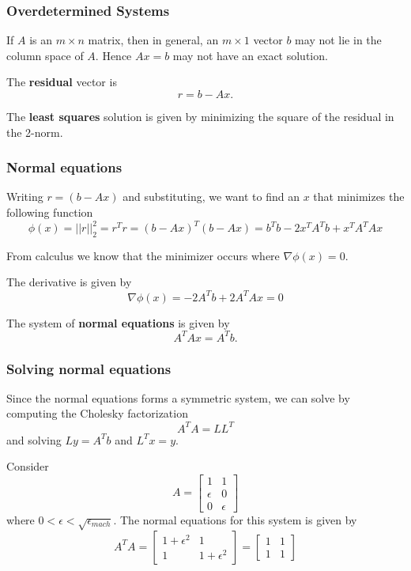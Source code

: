 \documentclass[10pt]{beamer}
\begin{document}
\begin{frame}
\frametitle{Overdetermined Systems}
If $A$ is an $m\times n$ matrix, then in general, an $m \times 1$ vector $b$ may not lie in the column space of $A$.  Hence $Ax=b$ may not have an exact solution.

\begin{definition} The {\bf{residual}} vector is  $$r = b-Ax.$$ 
\end{definition}
The {\bf{least squares}} solution is given by minimizing the square of the residual in the 2-norm.

\end{frame}
\begin{frame}
\frametitle{Normal equations}
Writing $r = (b-Ax)$ and substituting, we want to find an $x$ that minimizes the following function $$\phi(x) = ||r||^2_2 = r^Tr = (b-Ax)^T(b-Ax) = b^Tb - 2x^TA^Tb + x^TA^TAx$$

\bigskip

From calculus we know that the minimizer occurs where $\nabla\phi(x)=0$.  

\bigskip

The derivative is given by $$\nabla\phi(x) = -2A^Tb+  2A^TAx = 0$$


\begin{definition} The system of {\bf{normal equations}} is given by $$A^TAx = A^Tb.$$ 
\end{definition}
\end{frame}
\begin{frame}
\frametitle{Solving normal equations}
Since the normal equations forms a symmetric system, we can solve by computing the Cholesky factorization $$A^TA = LL^T$$ and solving $Ly = A^Tb$ and $L^Tx = y$.     

\bigskip

Consider 
\[A = 
\begin{bmatrix}
1 & 1 \\ 
\epsilon & 0 \\
0 & \epsilon
\end{bmatrix}
\]
where $0 < \epsilon < \sqrt{\epsilon_{mach}}$.  
The normal equations for this system is given by 
\[A^TA = \begin{bmatrix}
1+\epsilon^2 & 1 \\
1 & 1+\epsilon^2
\end{bmatrix} = 
\begin{bmatrix}
1 & 1 \\
1 & 1
\end{bmatrix}
\]
\end{frame}
\end{document}
